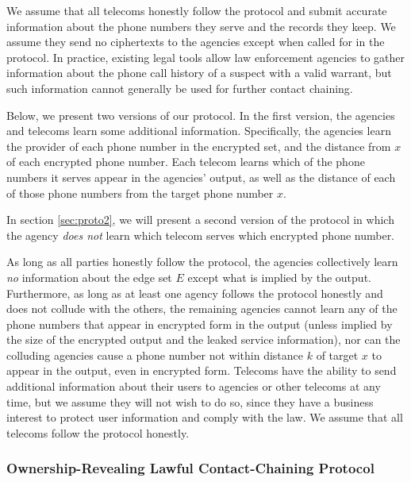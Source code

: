 We assume that all telecoms honestly follow the protocol and submit accurate information about the phone numbers they serve and the records they keep. We assume they send no ciphertexts to the agencies except when called for in the protocol. In practice, existing legal tools allow law enforcement agencies to gather information about the phone call history of a suspect with a valid warrant, but such information cannot generally be used for further contact chaining.



Below, we present two versions of our protocol. In the first version, the agencies and telecoms learn some additional information. Specifically, the agencies learn the provider of each phone number in the encrypted set, and the distance from $x$ of each encrypted phone number. Each telecom learns which of the phone numbers it serves appear in the agencies' output, as well as the distance of each of those phone numbers from the target phone number $x$.



In section \ref{sec:proto2}, we will present a second version of the protocol in which the agency \emph{does not} learn which telecom serves which encrypted phone number.



As long as all parties honestly follow the protocol, the agencies collectively learn \emph{no} information about the edge set $E$ except what is implied by the output. Furthermore, as long as at least one agency follows the protocol honestly and does not collude with the others, the remaining agencies cannot learn any of the phone numbers that appear in encrypted form in the output (unless implied by the size of the encrypted output and the leaked service information), nor can the colluding agencies cause a phone number not within distance $k$ of target $x$ to appear in the output, even in encrypted form. Telecoms have the ability to send additional information about their users to agencies or other telecoms at any time, but we assume they will not wish to do so, since they have a business interest to protect user information and comply with the law. We assume that all telecoms follow the protocol honestly.



\subsubsection{Ownership-Revealing Lawful Contact-Chaining Protocol}


